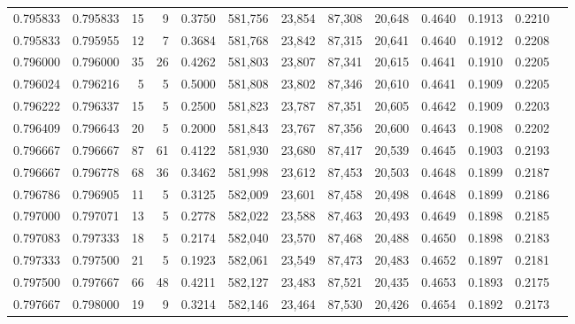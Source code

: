 \begin{tabular}{rrrrrrrrrrrrr}
0.795833 & 0.795833 &    15 &   9 &                                     0.3750 & 581,756 &  23,854 &  87,308 &  20,648 & 0.4640 & 0.1913 & 0.2210 \\
0.795833 & 0.795955 &    12 &   7 &                                     0.3684 & 581,768 &  23,842 &  87,315 &  20,641 & 0.4640 & 0.1912 & 0.2208 \\
0.796000 & 0.796000 &    35 &  26 &                                     0.4262 & 581,803 &  23,807 &  87,341 &  20,615 & 0.4641 & 0.1910 & 0.2205 \\
0.796024 & 0.796216 &     5 &   5 &                                     0.5000 & 581,808 &  23,802 &  87,346 &  20,610 & 0.4641 & 0.1909 & 0.2205 \\
0.796222 & 0.796337 &    15 &   5 &                                     0.2500 & 581,823 &  23,787 &  87,351 &  20,605 & 0.4642 & 0.1909 & 0.2203 \\
0.796409 & 0.796643 &    20 &   5 &                                     0.2000 & 581,843 &  23,767 &  87,356 &  20,600 & 0.4643 & 0.1908 & 0.2202 \\
0.796667 & 0.796667 &    87 &  61 &                                     0.4122 & 581,930 &  23,680 &  87,417 &  20,539 & 0.4645 & 0.1903 & 0.2193 \\
0.796667 & 0.796778 &    68 &  36 &                                     0.3462 & 581,998 &  23,612 &  87,453 &  20,503 & 0.4648 & 0.1899 & 0.2187 \\
0.796786 & 0.796905 &    11 &   5 &                                     0.3125 & 582,009 &  23,601 &  87,458 &  20,498 & 0.4648 & 0.1899 & 0.2186 \\
0.797000 & 0.797071 &    13 &   5 &                                     0.2778 & 582,022 &  23,588 &  87,463 &  20,493 & 0.4649 & 0.1898 & 0.2185 \\
0.797083 & 0.797333 &    18 &   5 &                                     0.2174 & 582,040 &  23,570 &  87,468 &  20,488 & 0.4650 & 0.1898 & 0.2183 \\
0.797333 & 0.797500 &    21 &   5 &                                     0.1923 & 582,061 &  23,549 &  87,473 &  20,483 & 0.4652 & 0.1897 & 0.2181 \\
0.797500 & 0.797667 &    66 &  48 &                                     0.4211 & 582,127 &  23,483 &  87,521 &  20,435 & 0.4653 & 0.1893 & 0.2175 \\
0.797667 & 0.798000 &    19 &   9 &                                     0.3214 & 582,146 &  23,464 &  87,530 &  20,426 & 0.4654 & 0.1892 & 0.2173 \\

\end{tabular}
